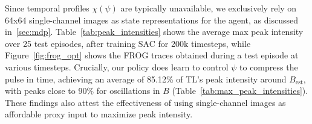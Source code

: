 Since temporal profiles \( \chi(\psi) \) are typically unavailable, we exclusively rely on 64x64 single-channel images as state representations for the agent, as discussed in~\cref{sec:mdp}.
Table~\ref{tab:peak_intensities} shows the average max peak intensity over 25 test episodes, after training SAC for 200k timesteps, while Figure~\ref{fig:frog_opt} shows the FROG traces obtained during a test episode at various timesteps. Crucially, our policy does learn to control \( \psi \) to compress the pulse in time, achieving an average of 85.12\% of TL's peak intensity around \(B_{\text{est}} \), with peaks close to 90\% for oscillations in \( B \) (Table~\ref{tab:max_peak_intensities}). These findings also attest the effectiveness of using single-channel images as affordable proxy input to maximize peak intensity.

\begin{table}
    \centering
    \caption{Average (plus-minus standard deviation) maximal peak intensity over 25 test episodes, for a combination of algorithms, training and testing conditions. We test our algorithms on fixed values of \( B \).
    }
    \label{tab:peak_intensities}
\end{table}
